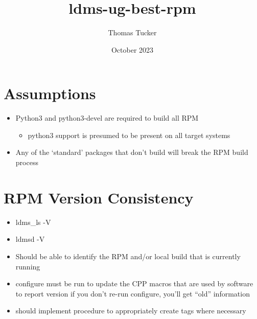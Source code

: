 \documentclass{article}
\title{ldms-ug-best-rpm}
\author{Thomas Tucker}
\date{October 2023}
\begin{document}
    \section{Assumptions}
        \begin{itemize}
                \item Python3 and python3-devel are required to build all RPM
                \begin{itemize}
                    \item python3 support is presumed to be present on all target systems
                \end{itemize}
                \item Any of the ‘standard’ packages that don’t build will break the RPM build process
        \end{itemize}
   \section{RPM Version Consistency}
        \begin{itemize}
                \item ldms\_ls -V
                \item ldmsd -V
                \item Should be able to identify the RPM and/or local build that is currently running
                \item configure must be run to update the CPP macros that are used by software to report version if you don’t re-run configure, you’ll get “old” information
                \item should implement procedure to appropriately create tags where necessary
        \end{itemize}        
\end{document}
